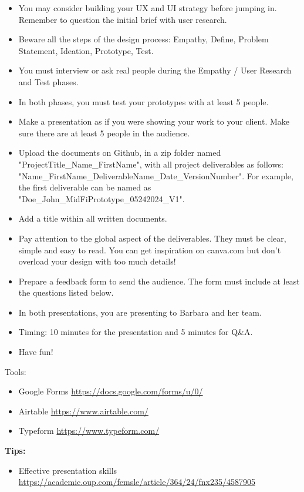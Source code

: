 \begin{itemize}
\item You may consider building your UX and UI strategy before jumping in. Remember to question the initial brief with user research.
\item Beware all the steps of the design process: Empathy, Define, Problem Statement, Ideation, Prototype, Test.
\item You must interview or ask real people during the Empathy / User Research and Test phases.
\item In both phases, you must test your prototypes with at least 5 people.
\item Make a presentation as if you were showing your work to your client. Make sure there are at least 5 people in the audience.
\item Upload the documents on Github, in a zip folder named "ProjectTitle\_Name\_FirstName", with all project deliverables as follows: "Name\_FirstName\_DeliverableName\_Date\_VersionNumber".  For example, the first deliverable can be named as "Doe\_John\_MidFiPrototype\_05242024\_V1".
\item Add a title within all written documents.
\item Pay attention to the global aspect of the deliverables. They must be clear, simple and easy to read. You can get inspiration on canva.com but don't overload your design with too much details!
\item Prepare a feedback form to send the audience. The form must include at least the questions listed below.
\item In both presentations, you are presenting to Barbara and her team.
\item Timing: 10 minutes for the presentation and 5 minutes for Q\&A.
\item Have fun!
\end{itemize}

Tools:

\begin{itemize}
\item Google Forms \url{https://docs.google.com/forms/u/0/}
\item Airtable \url{https://www.airtable.com/}
\item Typeform \url{https://www.typeform.com/}
\end{itemize}

\textbf{Tips:}

\begin{itemize}
\item Effective presentation skills \url{https://academic.oup.com/femsle/article/364/24/fnx235/4587905}
\end{itemize}

